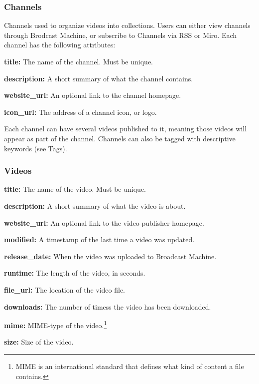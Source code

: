 \documentclass[a4paper,12pt]{report}
\begin{document}
\subsubsection*{Channels}
Channels used to organize videos into collections. Users can either view channels through Brodcast Machine, or subscribe to Channels via RSS or Miro. Each channel has the following attributes:
\begin{description}
\item{\textbf{title: } The name of the channel. Must be unique.}
\item{\textbf{description: } A short summary of what the channel contains.}
\item{\textbf{website\_url: } An optional link to the channel homepage.}
\item{\textbf{icon\_url: } The address of a channel icon, or logo.}
\end{description}
Each channel can have several videos published to it, meaning those videos will appear as part of the channel. Channels can also be tagged with descriptive keywords (see Tags).

\subsubsection*{Videos}
\begin{description}
\item{\textbf{title: } The name of the video. Must be unique.}
\item{\textbf{description: } A short summary of what the video is about.}
\item{\textbf{website\_url: } An optional link to the video publisher homepage.}
\item{\textbf{modified: } A timestamp of the last time a video was updated.}
\item{\textbf{release\_date: } When the video was uploaded to Broadcast Machine.}
\item{\textbf{runtime: } The length of the video, in seconds.}
\item{\textbf{file\_url: } The location of the video file.}
\item{\textbf{downloads: } The number of timess the video has been downloaded.}
\item{\textbf{mime: } MIME-type of the video.\footnote{MIME is an international standard that defines what kind of content a file contains.}}
\item{\textbf{size: } Size of the video.}
\end{description}
\end{document}

